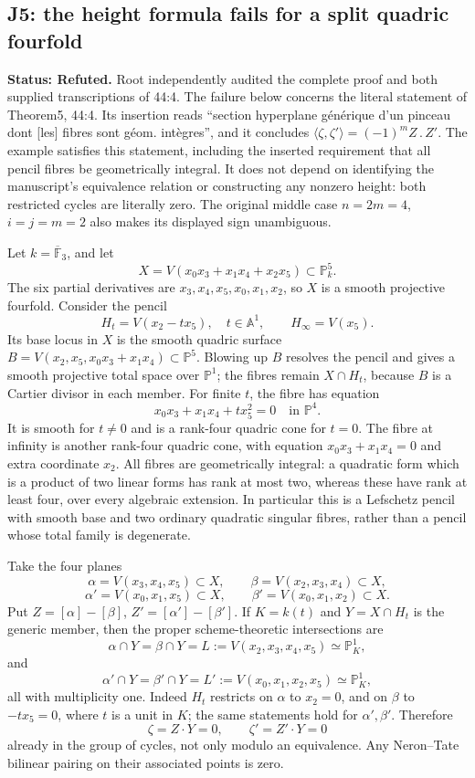 \subsection*{J5: the height formula fails for a split quadric fourfold}
\textbf{Status: Refuted.} Root independently audited the complete proof and both supplied transcriptions of 44:4.
The failure below concerns the literal statement of Theorem5, 44:4.
Its insertion reads ``section hyperplane générique d'un pinceau dont
[les] fibres sont géom. intègres'', and it concludes
$\langle\zeta,\zeta'\rangle=(-1)^mZ\mathbin{.}Z'$.
The example satisfies this statement,
including the inserted requirement that all pencil fibres be
geometrically integral. It does not depend on identifying the
manuscript's equivalence relation or constructing any nonzero height:
both restricted cycles are literally zero. The original middle
case $n=2m=4$, $i=j=m=2$ also makes its displayed sign unambiguous.

Let $k=\overline{\mathbb F}_3$, and let
\[
 X=V(x_0x_3+x_1x_4+x_2x_5)\subset\mathbb P^5_k.
\]
The six partial derivatives are $x_3,x_4,x_5,x_0,x_1,x_2$,
so $X$ is a smooth projective fourfold. Consider the pencil
\[
 H_t=V(x_2-tx_5),\quad t\in\mathbb A^1,
 \qquad H_\infty=V(x_5).
\]
Its base locus in $X$ is the smooth quadric surface
$B=V(x_2,x_5,x_0x_3+x_1x_4)\subset\mathbb P^5$.
Blowing up $B$ resolves the pencil and gives a smooth projective
total space over $\mathbb P^1$; the fibres remain $X\cap H_t$,
because $B$ is a Cartier divisor in each member. For finite $t$,
the fibre has equation
\[
                 x_0x_3+x_1x_4+t x_5^2=0
                 \quad\text{in }\mathbb P^4.
\]
It is smooth for $t\ne0$ and is a rank-four quadric cone for $t=0$.
The fibre at infinity is another rank-four quadric cone, with
equation $x_0x_3+x_1x_4=0$ and extra coordinate $x_2$.
All fibres are geometrically integral: a quadratic form which is
a product of two linear forms has rank at most two, whereas these
have rank at least four, over every algebraic extension.
In particular this is a Lefschetz pencil with smooth base and two
ordinary quadratic singular fibres, rather than a pencil whose
total family is degenerate.

Take the four planes
\[
 \alpha=V(x_3,x_4,x_5)\subset X,
 \qquad
 \beta=V(x_2,x_3,x_4)\subset X,
\]
\[
 \alpha'=V(x_0,x_1,x_5)\subset X,
 \qquad
 \beta'=V(x_0,x_1,x_2)\subset X.
\]
Put $Z=[\alpha]-[\beta]$, $Z'=[\alpha']-[\beta']$.
If $K=k(t)$ and $Y=X\cap H_t$ is the generic
member, then the proper scheme-theoretic intersections are
\[
 \alpha\cap Y=\beta\cap Y
   =L:=V(x_2,x_3,x_4,x_5)\simeq\mathbb P^1_K,
\]
and
\[
 \alpha'\cap Y=\beta'\cap Y
   =L':=V(x_0,x_1,x_2,x_5)\simeq\mathbb P^1_K,
\]
all with multiplicity one. Indeed $H_t$ restricts on $\alpha$
to $x_2=0$, and on $\beta$ to $-t x_5=0$, where $t$ is a unit
in $K$; the same statements hold for $\alpha',\beta'$.
Therefore
\[
                  \zeta=Z\cdot Y=0,
                  \qquad \zeta'=Z'\cdot Y=0             \tag{J5.1}
\]
already in the group of cycles, not only modulo an equivalence.
Any Neron--Tate bilinear pairing on their associated points is zero.

